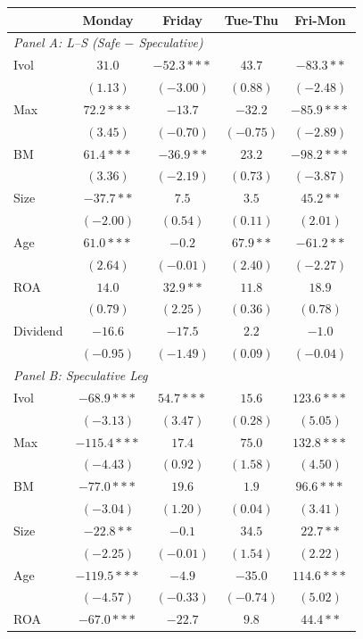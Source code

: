 \centering
\footnotesize
\begin{tabular}{l c c c c}
\toprule
 & Monday & Friday & Tue-Thu & Fri-Mon \\
\midrule
\multicolumn{5}{l}{\textit{Panel A: L--S (Safe $-$ Speculative)}} \\
Ivol & $31.0$ & $-52.3***$ & $43.7$ & $-83.3**$ \\
 & $(1.13)$ & $(-3.00)$ & $(0.88)$ & $(-2.48)$ \\
Max & $72.2***$ & $-13.7$ & $-32.2$ & $-85.9***$ \\
 & $(3.45)$ & $(-0.70)$ & $(-0.75)$ & $(-2.89)$ \\
BM & $61.4***$ & $-36.9**$ & $23.2$ & $-98.2***$ \\
 & $(3.36)$ & $(-2.19)$ & $(0.73)$ & $(-3.87)$ \\
Size & $-37.7**$ & $7.5$ & $3.5$ & $45.2**$ \\
 & $(-2.00)$ & $(0.54)$ & $(0.11)$ & $(2.01)$ \\
Age & $61.0***$ & $-0.2$ & $67.9**$ & $-61.2**$ \\
 & $(2.64)$ & $(-0.01)$ & $(2.40)$ & $(-2.27)$ \\
ROA & $14.0$ & $32.9**$ & $11.8$ & $18.9$ \\
 & $(0.79)$ & $(2.25)$ & $(0.36)$ & $(0.78)$ \\
Dividend & $-16.6$ & $-17.5$ & $2.2$ & $-1.0$ \\
 & $(-0.95)$ & $(-1.49)$ & $(0.09)$ & $(-0.04)$ \\
\midrule
\multicolumn{5}{l}{\textit{Panel B: Speculative Leg}} \\
Ivol & $-68.9***$ & $54.7***$ & $15.6$ & $123.6***$ \\
 & $(-3.13)$ & $(3.47)$ & $(0.28)$ & $(5.05)$ \\
Max & $-115.4***$ & $17.4$ & $75.0$ & $132.8***$ \\
 & $(-4.43)$ & $(0.92)$ & $(1.58)$ & $(4.50)$ \\
BM & $-77.0***$ & $19.6$ & $1.9$ & $96.6***$ \\
 & $(-3.04)$ & $(1.20)$ & $(0.04)$ & $(3.41)$ \\
Size & $-22.8**$ & $-0.1$ & $34.5$ & $22.7**$ \\
 & $(-2.25)$ & $(-0.01)$ & $(1.54)$ & $(2.22)$ \\
Age & $-119.5***$ & $-4.9$ & $-35.0$ & $114.6***$ \\
 & $(-4.57)$ & $(-0.33)$ & $(-0.74)$ & $(5.02)$ \\
ROA & $-67.0***$ & $-22.7$ & $9.8$ & $44.4**$ \\

\end{tabular}
